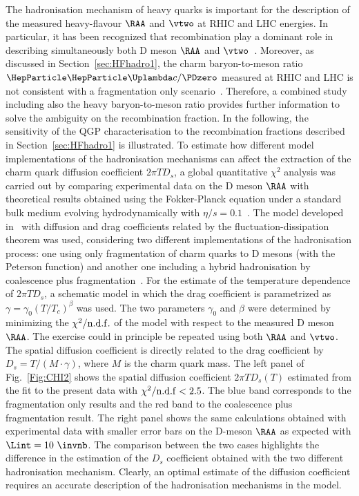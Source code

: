 The hadronisation mechanism of heavy quarks is important for the description of the measured
heavy-flavour $\RAA$ and $\vtwo$ at RHIC and LHC energies. In particular, it has been recognized that recombination
play a dominant role in describing simultaneously both D meson $\RAA$ and $\vtwo$~\cite{Gossiaux:2008jv,He:2011qa,Scardina:2017ipo}.
Moreover, as discussed in Section~\ref{sec:HFhadro1}, the charm baryon-to-meson ratio $\PGLc/\PDzero$ measured at RHIC and LHC is not consistent with a fragmentation only scenario~\cite{Oh:2009zj,Plumari:2017ntm}.
Therefore, a combined study including also the heavy baryon-to-meson ratio provides further
information to solve the ambiguity on the
recombination fraction. In the following, the sensitivity
of the QGP characterisation to the
recombination fractions described in Section~\ref{sec:HFhadro1} is illustrated.
To estimate how different model implementations of the hadronisation mechanisms can affect the extraction of the charm quark diffusion coefficient $2\pi T D_s$,
a global quantitative $\chi^2$ analysis was carried out by comparing experimental data on the D meson $\RAA$ with theoretical
results obtained using the Fokker-Planck equation under a standard bulk medium evolving
hydrodynamically with $\eta/s=0.1$~\cite{Plumari:2015cfa,Ruggieri:2013ova}.
The model developed in~\cite{Das:2015ana,Das:2013kea} with diffusion and drag
coefficients related by the fluctuation-dissipation theorem was used, considering two different
implementations of the hadronisation process: one using only fragmentation of charm quarks to D mesons (with the Peterson function)
and another one including a hybrid hadronisation by coalescence plus fragmentation~\cite{Plumari:2017ntm,Scardina:2017ipo}.
For the estimate of the temperature dependence of $2\pi T D_s$, a schematic model in which the
drag coefficient is parametrized as $\gamma=\gamma_0 (T/T_{c})^{\beta}$ was used. The two parameters $\gamma_0$ and $\beta$ were determined by minimizing the
$\chi^2/{\rm n.d.f.}$ of the model with respect to the measured D meson $\RAA$. The exercise could in principle be repeated using both $\RAA$ and $\vtwo$. 
The spatial diffusion coefficient is directly related to
the drag coefficient by $D_s=T/(M\cdot\gamma)$, where $M$ is the charm quark mass.
The left panel of Fig.~\ref{Fig:CHI2} shows the spatial diffusion coefficient
$2 \pi T D_s(T)$ estimated from the fit to the present data with $\chi^2/ {\rm n.d.f} < 2.5$. The blue band corresponds to the fragmentation 
only results and the red band to the coalescence plus fragmentation result.
The right panel shows the same calculations obtained with experimental data 
with smaller error bars on the D-meson $\RAA$ as expected with $\Lint=10~\invnb$.
The comparison between the two cases highlights the difference in the estimation 
of the $D_s$ coefficient obtained with the two different hadronisation mechanism.
Clearly, an optimal estimate of the diffusion coefficient requires an accurate description of the hadronisation mechanisms in the model.



